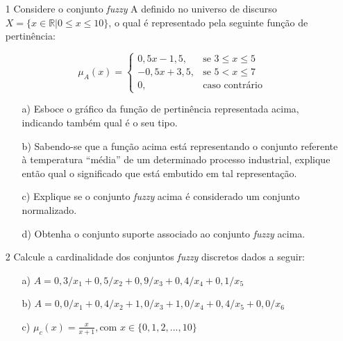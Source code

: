 \documentclass{report}
\begin{document}
\newpage

\begin{enumerate}

\item[1] Considere o conjunto \emph{fuzzy} A definido no universo de discurso $X = \{ x \in  \mathbb{R} \vert 0 \le x \le 10\}$,
o qual é representado pela seguinte função de pertinência:


\begin{equation*}
\mu_A (x) = 
\begin{cases} 
0,5x-1,5, & \text{se $3 \leq x \leq 5$}
\\
-0,5x+3,5, & \text{se $5 < x \leq 7$}
\\
0, &\text{caso contrário}
\end{cases}
\end{equation*}

\begin{enumerate}
    \item[a)] Esboce o gráfico da função de pertinência representada acima, indicando também qual é o seu tipo.
    \item[b)] Sabendo-se que a função acima está representando o conjunto referente à temperatura ``média'' de um determinado
    processo industrial, explique então qual o significado que está embutido em tal representação.
    \item[c)] Explique se o conjunto \emph{fuzzy} acima é considerado um conjunto normalizado.
    \item[d)] Obtenha o conjunto suporte associado ao conjunto \emph{fuzzy} acima.
\end{enumerate}

\item[2] Calcule a cardinalidade dos conjuntos \emph{fuzzy} discretos dados a seguir:
\begin{enumerate}
    \item[a)] $A = 0,3/x_1 + 0,5/x_2 + 0,9/x_3 + 0,4/x_4 + 0,1/x_5$
    \item[b)] $A = 0,0/x_1 + 0,4/x_2 + 1,0/x_3 + 1,0/x_4 + 0,4/x_5 + 0,0/x_6$
    \item[c)] $\mu_c(x)=\frac{x}{x+1}, \text{com } x \in \{0,1,2,...,10 \}$
\end{enumerate}


\end{enumerate}
\end{document}
